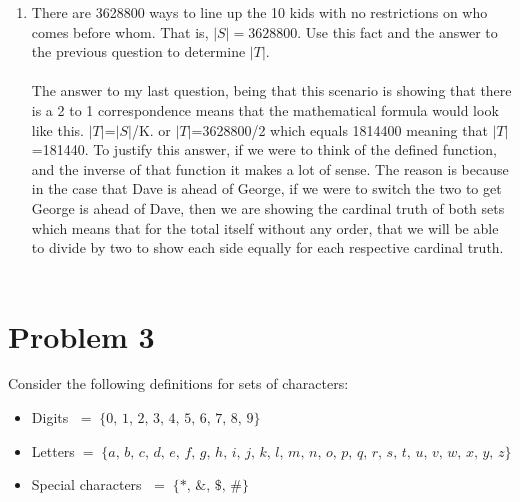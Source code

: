 \begin{enumerate}[label=(\alph*)]
\\\\
  \item There are 3628800 ways to line up the 10 kids with no restrictions on who comes before whom. That is, $|S| =3628800$. Use this fact and the answer to the previous question to determine $|T|$.\\\\
The answer to my last question, being that this scenario is showing that there is a 2 to 1 correspondence means that the mathematical formula would look like this. $|T|$=$|S|$/K. or $|T|$=3628800/2 which equals 1814400 meaning that $|T|$=181440. To justify this answer, if we were to think of the defined function, and the inverse of that function it makes a lot of sense. The reason is because in the case that Dave is ahead of George, if we were to switch the two to get George is ahead of Dave, then we are showing the cardinal truth of both sets which means that for the total itself without any order, that we will be able to divide by two to show each side equally for each respective cardinal truth.
\\\\
\end{enumerate}

   
   \newpage

\section*{Problem 3}
   
   
\item Consider the following definitions for sets of characters:
\begin{itemize}
  \item Digits $\;=\; \{ 0,\, 1,\, 2,\, 3,\, 4,\, 5,\, 6,\, 7,\, 8,\, 9 \}$\\
  \item Letters$\; = \;\{ a,\, b,\, c, \,d,\, e,\, f,\, g,\, h,\, i,\, j,\, k,\, l,\, m,\, n,\, o,\, p,\, q,\, r,\, s,\, t,\, u,\, v,\, w,\, x,\, y,\, z \}$\\
  \item Special characters $\;=\; \{ *,\, \&,\, \$,\, \# \}$\\
\end{itemize}

